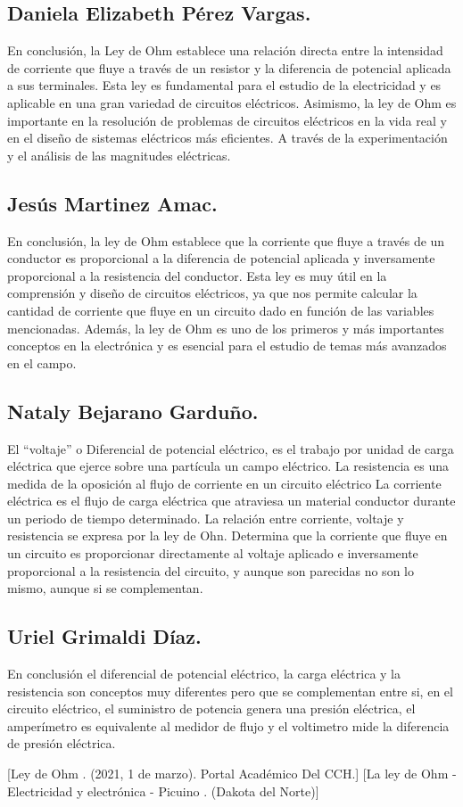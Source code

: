 \documentclass[10pt]{article}
\begin{document}
\begin{multicols}{2}
\subsection*{Daniela Elizabeth Pérez Vargas.}
En conclusión, la Ley de Ohm establece una relación directa entre la intensidad de corriente que fluye a través de un resistor y la diferencia de potencial aplicada a sus terminales. Esta ley es fundamental para el estudio de la electricidad y es aplicable en una gran variedad de circuitos eléctricos. Asimismo, la ley de Ohm es importante en la resolución de problemas de circuitos eléctricos en la vida real y en el diseño de sistemas eléctricos más eficientes. A través de la experimentación y el análisis de las magnitudes eléctricas.
\subsection*{Jesús Martinez Amac.}
En conclusión, la ley de Ohm establece que la corriente que fluye a través de un conductor es proporcional a la diferencia de potencial aplicada y inversamente proporcional a la resistencia del conductor. Esta ley es muy útil en la comprensión y diseño de circuitos eléctricos, ya que nos permite calcular la cantidad de corriente que fluye en un circuito dado en función de las variables mencionadas. Además, la ley de Ohm es uno de los primeros y más importantes conceptos en la electrónica y es esencial para el estudio de temas más avanzados en el campo.

\subsection*{Nataly Bejarano Garduño.}
El “voltaje” o Diferencial de potencial eléctrico, es el trabajo por unidad de carga eléctrica que ejerce sobre una partícula un campo eléctrico. La resistencia es una medida de la oposición al flujo de corriente en un circuito eléctrico La corriente eléctrica es el flujo de carga eléctrica que atraviesa un material conductor durante un periodo de tiempo determinado. 
La relación entre corriente, voltaje y resistencia se expresa por la ley de Ohn. Determina que la corriente que fluye en un circuito es proporcionar directamente al voltaje aplicado e inversamente proporcional a la resistencia del circuito, y aunque son parecidas no son lo mismo, aunque si se complementan.

\subsection*{Uriel Grimaldi Díaz.}
En conclusión el diferencial de potencial eléctrico, la carga eléctrica y la resistencia son conceptos muy diferentes pero que se complementan entre si, en el circuito eléctrico, el suministro de potencia genera una presión eléctrica, el amperímetro es equivalente al medidor de flujo y el voltimetro mide la diferencia de presión eléctrica.

\begin{thebibliography}{0}
	[Ley de Ohm . (2021, 1 de marzo). Portal Académico Del CCH.]
	[La ley de Ohm - Electricidad y electrónica - Picuino . (Dakota del Norte)]
		
\end{thebibliography}

\end{multicols}
\end{document}
